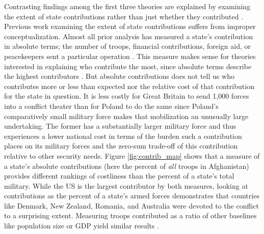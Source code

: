 \documentclass[12pt,letterpaper]{article}
\begin{document}
		Contrasting findings among the first three theories are explained by examining the extent of state contributions rather than just whether they contributed \citep[4]{cranmer_coalitionqualitymultinational_2017}. Previous work examining the extent of state contributions suffers from improper conceptualization. Almost all prior analysis has measured a state's contribution in absolute terms; the number of troops, financial contributions, foreign aid, or peacekeepers sent a particular operation \citep{mello_democraticparticipationarmed_2014, haesebrouck_explainingmemberstates_2016}. This measure makes sense for theories interested in explaining who contribute the most, since absolute terms describe the highest contributors \citep[40-41]{bogers_missionafghanistanwho_2013}. But absolute contributions does not tell us who contributes more or less than expected nor the relative cost of that contribution for the state in question. It is less costly for Great Britain to send 1,000 forces into a conflict theater than for Poland to do the same since Poland's comparatively small military force makes that mobilization an unusually large undertaking. The former has a substantially larger military force and thus experiences a lower national cost in terms of the burden such a contribution places on its military forces and the zero-sum trade-off of this contribution relative to other security needs. Figure \ref{fig:contrib_map} shows that a measure of a state's absolute contributions (here the percent of \emph{all} troops in Afghanistan) provides different rankings of costliness than the percent of a state's total military.
		While the US is the largest contributor by both measures, looking at contributions as the percent of a state's armed forces demonstrates that countries like Denmark, New Zealand, Romania, and Australia were devoted to the conflict to a surprising extent. Measuring troops contributed as a ratio of other baselines like population size or GDP yield similar results \citep[41]{bogers_missionafghanistanwho_2013}.

\end{document}
